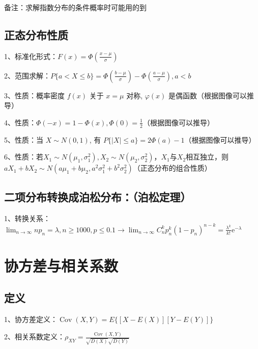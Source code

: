 备注：求解指数分布的条件概率时可能用的到



\subsection{正态分布性质}

1、标准化形式：$ F(x)=\Phi\left(\frac{x-\mu}{\sigma}\right) $

2、范围求解：$ P\{a<X \leqslant b\}=\Phi\left(\frac{b-\mu}{\sigma}\right)-\Phi\left(\frac{a-\mu}{\sigma}\right), a<b $

3、性质：概率密度 $ f(x) $ 关于 $ x=\mu $ 对称, $ \varphi(x) $ 是偶函数（根据图像可以推导）

4、性质：$ \Phi(-x)=1-\Phi(x), \Phi(0)=\frac{1}{2} $（根据图像可以推导）

5、性质：当 $ X \sim N(0,1) $, 有 $ P\{|X| \leqslant a\}=2 \Phi(a)-1 $（根据图像可以推导）

6、性质：若$ X_{1} \sim N\left(\mu_{1}, \sigma_{1}^{2}\right), X_{2} \sim N\left(\mu_{2}, \sigma_{2}^{2}\right) $，$ X_{1} $与$ X_{2} $相互独立，则$ a X_{1}+b X_{2} \sim N\left(a \mu_{1}+b \mu_{2}, a^{2} \sigma_{1}^{2}+b^{2} \sigma_{2}^{2}\right) $（正态分布的组合性质）



\subsection{二项分布转换成泊松分布：（泊松定理）}

1、转换关系：$ \lim_{n \rightarrow \infty}np_n=\lambda, n\ge1000,p\le0.1 \rightarrow \lim _{n \rightarrow \infty} C_{n}^{k} p_{n}^{k}\left(1-p_{n}\right)^{n-k}=\frac{\lambda^{k}}{k !} \mathrm{e}^{-\lambda} $

\section{协方差与相关系数}



\subsection{定义}

1、协方差定义：$ \operatorname{Cov}(X, Y)=E\{[X-E(X)][Y-E(Y)]\} $

2、相关系数定义：$ \rho_{X Y}=\frac{\operatorname{Cov}(X, Y)}{\sqrt{D(X)} \sqrt{D(Y)}} $



